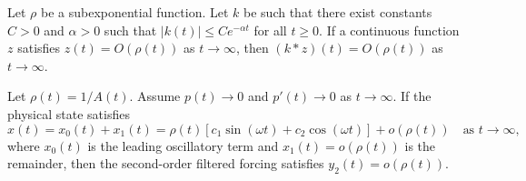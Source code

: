\documentclass[10pt,a4paper]{amsart}
\begin{document}
	\begin{lemma} \label{lem:subexp_conv}
		Let $\rho$ be a subexponential function. Let $k$ be such that there exist constants $C > 0$ and $\alpha > 0$ such that $|k(t)| \le C e^{-\alpha t}$ for all $t \ge 0$. 
		If a continuous function $z$ satisfies $z(t) = O(\rho(t))$ as $t \to \infty$, then $(k * z)(t) = O(\rho(t))$ as $t \to \infty$.
	\end{lemma}

	\begin{theorem} \label{thm:asymp_implies_y2}
		Let $\rho(t) = 1/A(t)$. Assume $p(t) \to 0$ and $p'(t) \to 0$ as $t \to \infty$. 
		If the physical state satisfies
		\[ x(t) = x_0(t) + x_1(t) = \rho(t)\left[c_1 \sin(\omega t) + c_2 \cos(\omega t)\right] + o(\rho(t)) \quad \text{as } t \to \infty, \]
		where $x_0(t)$ is the leading oscillatory term and $x_1(t) = o(\rho(t))$ is the remainder, then the second-order filtered forcing satisfies $y_2(t) = o(\rho(t))$.
	\end{theorem}
\end{document}
